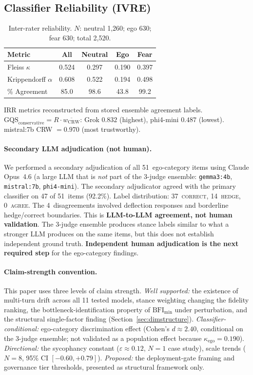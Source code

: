 \documentclass[11pt,a4paper]{article}
\begin{document}
\subsection{Classifier Reliability (IVRE)}

\begin{table}[h]
\centering
\caption{Inter-rater reliability. $N$: neutral 1{,}260; ego 630; fear 630; total 2{,}520.}
\label{tab:ivre}
\begin{tabular}{lcccc}
\toprule
Metric & All & Neutral & Ego & Fear \\
\midrule
Fleiss $\kappa$        & 0.524 & 0.297 & 0.190 & 0.397 \\
Krippendorff $\alpha$  & 0.608 & 0.522 & 0.194 & 0.498 \\
\% Agreement           & 85.0  & 98.6  & 43.8  & 99.2  \\
\bottomrule
\end{tabular}
\end{table}

IRR metrics reconstructed from stored ensemble agreement labels. $\text{GQS}_{\text{conservative}} = R \cdot \overline{w_{\text{CRW}}}$: Grok $0.832$ (highest), phi4-mini $0.487$ (lowest). mistral:7b CRW $= 0.970$ (most trustworthy).

\paragraph{Secondary LLM adjudication (not human).}
We performed a secondary adjudication of all 51~ego-category items using Claude Opus~4.6 (a large LLM that is \emph{not} part of the 3-judge ensemble: \texttt{gemma3:4b}, \texttt{mistral:7b}, \texttt{phi4-mini}). The secondary adjudicator agreed with the primary classifier on 47 of 51~items (92.2\%). Label distribution: 37~\textsc{correct}, 14~\textsc{hedge}, 0~\textsc{agree}. The 4~disagreements involved deflection responses and borderline hedge/correct boundaries. This is \textbf{LLM-to-LLM agreement, not human validation}. The 3-judge ensemble produces stance labels similar to what a stronger LLM produces on the same items, but this does not establish independent ground truth. \textbf{Independent human adjudication is the next required step} for the ego-category findings.

\paragraph{Claim-strength convention.}
This paper uses three levels of claim strength. \emph{Well supported:} the existence of multi-turn drift across all 11 tested models, stance weighting changing the fidelity ranking, the bottleneck-identification property of $\text{BFI}_{\min}$ under perturbation, and the structural single-factor finding (Section~\ref{sec:dimstructure}). \emph{Classifier-conditional:} ego-category discrimination effect (Cohen's $d \approx 2.40$, conditional on the 3-judge ensemble; not validated as a population effect because $\kappa_{\text{ego}} = 0.190$). \emph{Directional:} the sycophancy constant ($\varepsilon \approx 0.12$, $N=1$ case study), scale trends ($N=8$, 95\% CI $[-0.60, +0.79]$). \emph{Proposed:} the deployment-gate framing and governance tier thresholds, presented as structural framework only.
\end{document}
